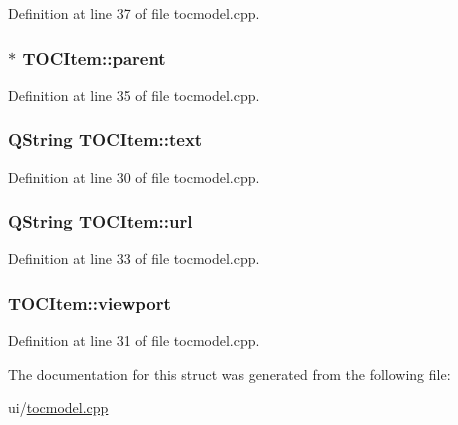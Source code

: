 Definition at line 37 of file tocmodel.\+cpp.

\hypertarget{structTOCItem_a690aa86297cce8bc277d28f8ccba1075}{
\subsubsection[{parent}]{$\ast$ T\+O\+C\+Item\+::parent}}\label{structTOCItem_a690aa86297cce8bc277d28f8ccba1075}


Definition at line 35 of file tocmodel.\+cpp.

\hypertarget{structTOCItem_a15c67ed9a7ac8a4992955a3e7249111c}{
\subsubsection[{text}]{\setlength{\rightskip}{0pt plus 5cm}Q\+String T\+O\+C\+Item\+::text}}\label{structTOCItem_a15c67ed9a7ac8a4992955a3e7249111c}


Definition at line 30 of file tocmodel.\+cpp.

\hypertarget{structTOCItem_ad2cc1b82e1f4c163529fb6efcfc9c59a}{
\subsubsection[{url}]{\setlength{\rightskip}{0pt plus 5cm}Q\+String T\+O\+C\+Item\+::url}}\label{structTOCItem_ad2cc1b82e1f4c163529fb6efcfc9c59a}


Definition at line 33 of file tocmodel.\+cpp.

\hypertarget{structTOCItem_a4e72f01f6a8248cb770a35e16e33652a}{
\subsubsection[{viewport}]{ T\+O\+C\+Item\+::viewport}}\label{structTOCItem_a4e72f01f6a8248cb770a35e16e33652a}


Definition at line 31 of file tocmodel.\+cpp.



The documentation for this struct was generated from the following file\+:\begin{DoxyCompactItemize}
\item 
ui/\hyperlink{tocmodel_8cpp}{tocmodel.\+cpp}\end{DoxyCompactItemize}
